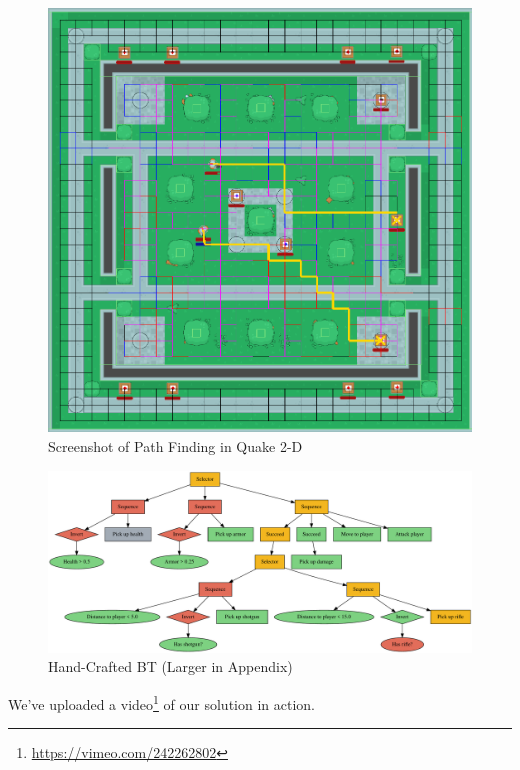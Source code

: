 \documentclass[a4paper, twocolumn]{article}
\begin{document}
        \begin{figure}[H]
            \centering
            \includegraphics[width=\linewidth]{share/path_finding_screenshot.png}
            \caption{Screenshot of Path Finding in Quake 2-D}
            \label{fig:path_finding_screenshot}
        \end{figure}

        \begin{figure}[H]
            \centering
            \includegraphics[width=\linewidth]{share/hand_crafted_behaviour_tree.pdf}
            \caption{Hand-Crafted BT (Larger in Appendix)}
            \label{fig:hand_crafted_behaviour_tree}
        \end{figure}

        We've uploaded a video\footnote{\url{https://vimeo.com/242262802}} of our solution in action.
\end{document}
